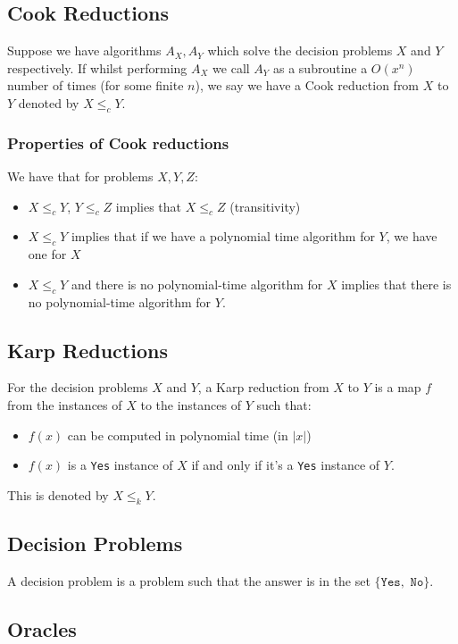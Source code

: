 \documentclass[a4paper, 12pt, twoside]{article}
\begin{document}
\subsection{Cook Reductions}

Suppose we have algorithms $A_X, A_Y$ which solve the decision problems 
$X$ and $Y$ respectively. If whilst performing $A_X$ we call $A_Y$ as a 
subroutine a $O(x^n)$ number of times (for some finite $n$), we say
we have a Cook reduction from $X$ to $Y$ denoted by $X \leq_c Y$.

\subsubsection{Properties of Cook reductions}

We have that for problems $X, Y, Z$: \begin{itemize}
  \item $X \leq_c Y$, $Y \leq_c Z$ implies that $X \leq_c Z$ (transitivity)
  \item $X \leq_c Y$ implies that if we have a polynomial time algorithm for $Y$, 
  we have one for $X$
  \item $X \leq_c Y$ and there is no polynomial-time algorithm for $X$ implies 
  that there is no polynomial-time algorithm for $Y$.
\end{itemize}

\subsection{Karp Reductions}

For the decision problems $X$ and $Y$, a Karp reduction from $X$ to $Y$
is a map $f$ from the instances of $X$ to the instances of $Y$ such that:
\begin{itemize}
  \item $f(x)$ can be computed in polynomial time (in $|x|$)
  \item $f(x)$ is a \texttt{Yes} instance of $X$ if and only if it's a \texttt{Yes} instance
  of $Y$.
\end{itemize} This is denoted by $X \leq_k Y$.

\subsection{Decision Problems}

A decision problem is a problem such that the answer is in the set $\{\texttt{Yes},
\texttt{ No}\}$.

\subsection{Oracles}
\end{document}
